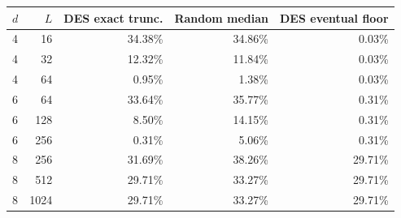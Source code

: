 \begin{tabular}{lrrrr}
\toprule
$d$ & $L$ & DES exact trunc. & Random median & DES eventual floor \\
\midrule
4 & 16 & 34.38\% & 34.86\% & 0.03\% \\
4 & 32 & 12.32\% & 11.84\% & 0.03\% \\
4 & 64 & 0.95\% & 1.38\% & 0.03\% \\
6 & 64 & 33.64\% & 35.77\% & 0.31\% \\
6 & 128 & 8.50\% & 14.15\% & 0.31\% \\
6 & 256 & 0.31\% & 5.06\% & 0.31\% \\
8 & 256 & 31.69\% & 38.26\% & 29.71\% \\
8 & 512 & 29.71\% & 33.27\% & 29.71\% \\
8 & 1024 & 29.71\% & 33.27\% & 29.71\% \\
\bottomrule
\end{tabular}
